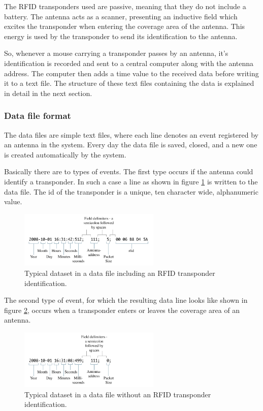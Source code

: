 The RFID transponders used are passive, meaning that they do not include a battery. The antenna acts as a scanner, presenting an inductive field which excites the transponder when entering the coverage area of the antenna. This energy is used by the transponder to send its identification to the antenna. 

So, whenever a mouse carrying a transponder passes by an antenna, it's identification is recorded and sent to a central computer along with the antenna address. The computer then adds a time value to the received data before writing it to a text file. The structure of these text files containing the data is explained in detail in the next section.

\subsubsection{Data file format}
\label{subsubsec:datafileformat}
The data files are simple text files, where each line denotes an event registered by an antenna in the system. Every day the data file is saved, closed, and a new one is created automatically by the system.

Basically there are to types of events. The first type occurs if the antenna could identify a transponder. In such a case a line as shown in figure \ref{fig:dataset} is written to the data file. The id of the transponder is a unique, ten character wide, alphanumeric value.

\begin{figure}[!htbp]	
\centering	
\includegraphics[width=0.6\textwidth]{assets/pdf/dataset.pdf}	
\caption[Dataset including an RFID transponder identification]{Typical dataset in a data file including an RFID transponder identification.}
\label{fig:dataset}
\end{figure}

The second type of event, for which the resulting data line looks like shown in figure \ref{fig:dataset_no_data}, occurs when a transponder enters or leaves the coverage area of an antenna.

\begin{figure}[!htbp]	
\centering	
\includegraphics[width=0.6\textwidth]{assets/pdf/dataset_no_data.pdf}	
\caption[Dataset without RFID transponder identification]{Typical dataset in a data file without an RFID transponder identification.}
\label{fig:dataset_no_data}
\end{figure}

